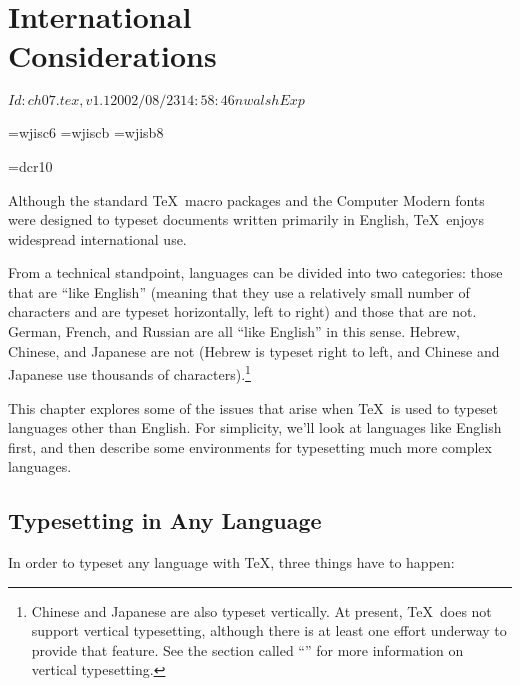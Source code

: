 \chapter[International Considerations]{International\\Considerations} 
\RCSID$Id: ch07.tex,v 1.1 2002/08/23 14:58:46 nwalsh Exp $
\label{chap:foreign}

\bgroup %
%

\font\jfcG=wjisc6
\font\jfcb=wjiscb
\font\jfbI=wjisb8
\def\pmj{{\tt pmJ}{\jfcG\char252\jfcb\char220\jfbI\char236}}

\font\dcr=dcr10
\def\guillemet{{\dcr\char"13\relax}}

Although the standard \TeX\ macro packages and the Computer Modern fonts were
designed to typeset documents written primarily in English, \TeX\ enjoys
widespread international 
use.  

From a technical standpoint, languages can be divided into two categories:
those that are ``like English'' (meaning that they use a relatively small
number of characters and are typeset horizontally, left to right) and those
that are not.  German, French, and Russian are all ``like English'' in this
sense.  Hebrew, Chinese, and 
Japanese are not (Hebrew is 
typeset right to left,
and Chinese and 
Japanese use 
thousands of characters).\footnote{Chinese and
Japanese are also typeset vertically.  At present, \TeX\ does not support
vertical typesetting, although there is at least one effort underway to provide
that feature.  See the section called ``'' for
more information on vertical typesetting.}

This chapter explores some of the issues that arise when \TeX\ is used to
typeset languages other than English.  For simplicity, we'll look at languages
like English first, and then describe some 
environments for typesetting much more complex languages.

\section{Typesetting in Any Language}

In order to typeset any 
language with \TeX, three things have to happen:

